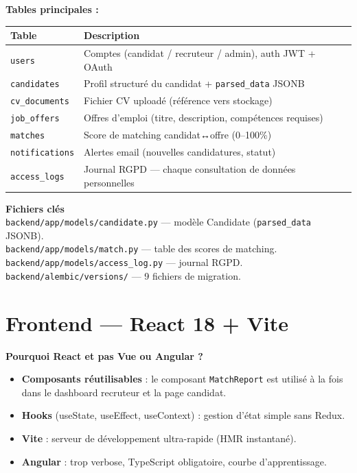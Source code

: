 \documentclass[12pt,a4paper]{report}
\newenvironment{infobox}[1][]{%
  \begin{framed}\noindent\textbf{\textcolor{navyblue}{#1}}\\[2pt]%
}{\end{framed}}
\newenvironment{whybox}[1][Pourquoi ce choix ?]{%
  \colorbox{yellow!20}{\textbf{\textcolor{navyblue}{#1}}}\vspace{2pt}
  \begin{framed}%
}{\end{framed}}
\newcommand{\filepath}[1]{\texttt{\small\textcolor{codeblue}{#1}}}
\begin{document}
\textbf{Tables principales :}

\begin{center}
\begin{tabularx}{\textwidth}{lX}
\toprule
\textbf{Table} & \textbf{Description} \\
\midrule
\texttt{users} & Comptes (candidat / recruteur / admin), auth JWT + OAuth \\
\texttt{candidates} & Profil structuré du candidat + \texttt{parsed\_data} JSONB \\
\texttt{cv\_documents} & Fichier CV uploadé (référence vers stockage) \\
\texttt{job\_offers} & Offres d'emploi (titre, description, compétences requises) \\
\texttt{matches} & Score de matching candidat↔offre (0–100\%) \\
\texttt{notifications} & Alertes email (nouvelles candidatures, statut) \\
\texttt{access\_logs} & Journal RGPD — chaque consultation de données personnelles \\
\bottomrule
\end{tabularx}
\end{center}

\begin{infobox}[Fichiers clés]
  \filepath{backend/app/models/candidate.py} — modèle Candidate (\texttt{parsed\_data} JSONB).\\
  \filepath{backend/app/models/match.py} — table des scores de matching.\\
  \filepath{backend/app/models/access\_log.py} — journal RGPD.\\
  \filepath{backend/alembic/versions/} — 9 fichiers de migration.
\end{infobox}

\section{Frontend — React 18 + Vite}

\begin{whybox}[Pourquoi React et pas Vue ou Angular ?]
\begin{itemize}
  \item \textbf{Composants réutilisables} : le composant \texttt{MatchReport} est
        utilisé à la fois dans le dashboard recruteur et la page candidat.
  \item \textbf{Hooks} (useState, useEffect, useContext) : gestion d'état simple
        sans Redux.
  \item \textbf{Vite} : serveur de développement ultra-rapide (HMR instantané).
  \item \textbf{Angular} : trop verbose, TypeScript obligatoire, courbe d'apprentissage.
\end{itemize}
\end{whybox}
\end{document}
